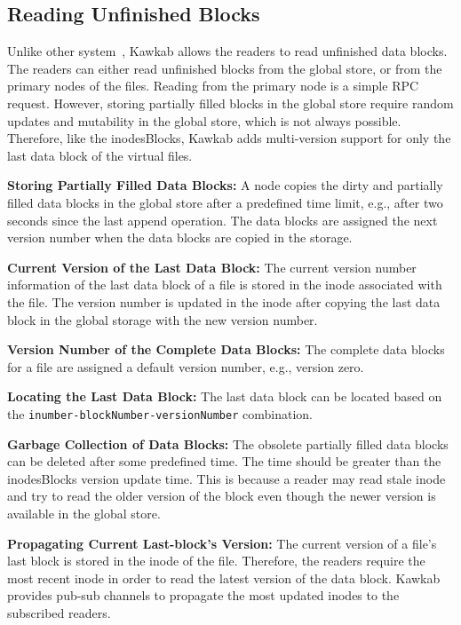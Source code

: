 \documentclass[]{article}
\newcommand{\subtopic}[1]{\vspace{1.5pt} \noindent \textbf{#1}}
\begin{document}
\subsection{Reading Unfinished Blocks}

Unlike other system~\cite{}, Kawkab allows the readers to read unfinished data
blocks. The readers can either read unfinished blocks from the global store, or
from the primary nodes of the files. Reading from the primary node is a simple
RPC request. However, storing partially filled blocks in the global store
require random updates and mutability in the global store, which is not always
possible. Therefore, like the inodesBlocks, Kawkab adds multi-version support
for only the last data block of the virtual files.

\subtopic{Storing Partially Filled Data Blocks:}
A node copies the dirty and partially filled data blocks in the global store after
a predefined time limit, e.g., after two seconds since the last append operation.
The data blocks are assigned the next version number when the data blocks are copied 
in the storage. 

\subtopic{Current Version of the Last Data Block:} The current version number
information of the last data block of a file is stored in the inode associated
with the file. The version number is updated in the inode after copying the
last data block in the global storage with the new version number.

\subtopic{Version Number of the Complete Data Blocks:} 
The complete data blocks for a file are assigned a default version number, e.g.,
version zero.

\subtopic{Locating the Last Data Block:} The last data block can be located
based on the \texttt{inumber-blockNumber-versionNumber} combination.

\subtopic{Garbage Collection of Data Blocks:}
The obsolete partially filled data blocks can be deleted after some predefined
time. The time should be greater than the inodesBlocks version update time.
This is because a reader may read stale inode and try to read the older version
of the block even though the newer version is available in the global store.


\subtopic{Propagating Current Last-block's Version:}
The current version of a file's last block is stored in the inode of the file.
Therefore, the readers require the most recent inode in order to read the
latest version of the data block. Kawkab provides pub-sub channels to propagate
the most updated inodes to the subscribed readers.
\end{document}
